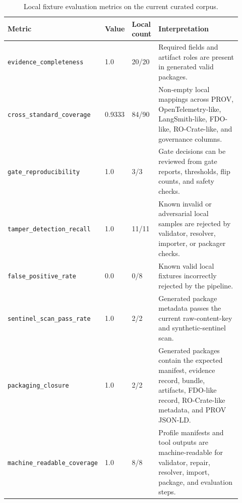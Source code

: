 \begin{table}[t]
\centering
\caption{Local fixture evaluation metrics on the current curated corpus.}
\begin{tabular}{p{0.24\linewidth}p{0.08\linewidth}p{0.10\linewidth}p{0.50\linewidth}}
\toprule
Metric & Value & Local count & Interpretation \\
\midrule
\texttt{evidence\_completeness} & 1.0 & 20/20 & Required fields and artifact roles are present in generated valid packages. \\
\texttt{cross\_standard\_coverage} & 0.9333 & 84/90 & Non-empty local mappings across PROV, OpenTelemetry-like, LangSmith-like, FDO-like, RO-Crate-like, and governance columns. \\
\texttt{gate\_reproducibility} & 1.0 & 3/3 & Gate decisions can be reviewed from gate reports, thresholds, flip counts, and safety checks. \\
\texttt{tamper\_detection\_recall} & 1.0 & 11/11 & Known invalid or adversarial local samples are rejected by validator, resolver, importer, or packager checks. \\
\texttt{false\_positive\_rate} & 0.0 & 0/8 & Known valid local fixtures incorrectly rejected by the pipeline. \\
\texttt{sentinel\_scan\_pass\_rate} & 1.0 & 2/2 & Generated package metadata passes the current raw-content-key and synthetic-sentinel scan. \\
\texttt{packaging\_closure} & 1.0 & 2/2 & Generated packages contain the expected manifest, evidence record, bundle, artifacts, FDO-like record, RO-Crate-like metadata, and PROV JSON-LD. \\
\texttt{machine\_readable\_coverage} & 1.0 & 8/8 & Profile manifests and tool outputs are machine-readable for validator, repair, resolver, import, package, and evaluation steps. \\
\bottomrule
\end{tabular}
\end{table}
